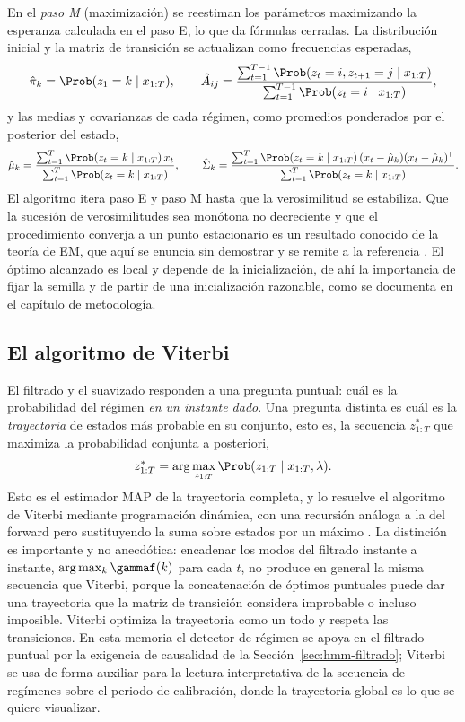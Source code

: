 En el \emph{paso M} (maximización) se reestiman los parámetros maximizando la esperanza calculada en el paso E, lo que da fórmulas cerradas. La distribución inicial y la matriz de transición se actualizan como frecuencias esperadas,
\[
\hat{\pi}_k = \Prob(z_1 = k \mid x_{1:T}),
\qquad
\hat{A}_{ij} = \frac{\sum_{t=1}^{T-1} \Prob(z_t = i, z_{t+1} = j \mid x_{1:T})}{\sum_{t=1}^{T-1} \Prob(z_t = i \mid x_{1:T})},
\]
y las medias y covarianzas de cada régimen, como promedios ponderados por el posterior del estado,
\[
\hat{\mu}_k = \frac{\sum_{t=1}^{T} \Prob(z_t = k \mid x_{1:T})\, x_t}{\sum_{t=1}^{T} \Prob(z_t = k \mid x_{1:T})},
\qquad
\hat{\Sigma}_k = \frac{\sum_{t=1}^{T} \Prob(z_t = k \mid x_{1:T})\, (x_t - \hat{\mu}_k)(x_t - \hat{\mu}_k)^{\!\top}}{\sum_{t=1}^{T} \Prob(z_t = k \mid x_{1:T})}.
\]
El algoritmo itera paso E y paso M hasta que la verosimilitud se estabiliza. Que la sucesión de verosimilitudes sea monótona no decreciente y que el procedimiento converja a un punto estacionario es un resultado conocido de la teoría de EM, que aquí se enuncia sin demostrar y se remite a la referencia \cite{baum1970, rabiner1989}. El óptimo alcanzado es local y depende de la inicialización, de ahí la importancia de fijar la semilla y de partir de una inicialización razonable, como se documenta en el capítulo de metodología.

\subsection{El algoritmo de Viterbi}
\label{sec:hmm-viterbi}

El filtrado y el suavizado responden a una pregunta puntual: cuál es la probabilidad del régimen \emph{en un instante dado}. Una pregunta distinta es cuál es la \emph{trayectoria} de estados más probable en su conjunto, esto es, la secuencia $z_{1:T}^{\ast}$ que maximiza la probabilidad conjunta a posteriori,
\[
z_{1:T}^{\ast} = \arg\max_{z_{1:T}} \Prob(z_{1:T} \mid x_{1:T}, \lambda).
\]
Esto es el estimador MAP de la trayectoria completa, y lo resuelve el algoritmo de Viterbi mediante programación dinámica, con una recursión análoga a la del forward pero sustituyendo la suma sobre estados por un máximo \cite{viterbi1967}. La distinción es importante y no anecdótica: encadenar los modos del filtrado instante a instante, $\arg\max_k \gammaf(k)$ para cada $t$, no produce en general la misma secuencia que Viterbi, porque la concatenación de óptimos puntuales puede dar una trayectoria que la matriz de transición considera improbable o incluso imposible. Viterbi optimiza la trayectoria como un todo y respeta las transiciones. En esta memoria el detector de régimen se apoya en el filtrado puntual por la exigencia de causalidad de la Sección~\ref{sec:hmm-filtrado}; Viterbi se usa de forma auxiliar para la lectura interpretativa de la secuencia de regímenes sobre el periodo de calibración, donde la trayectoria global es lo que se quiere visualizar.

